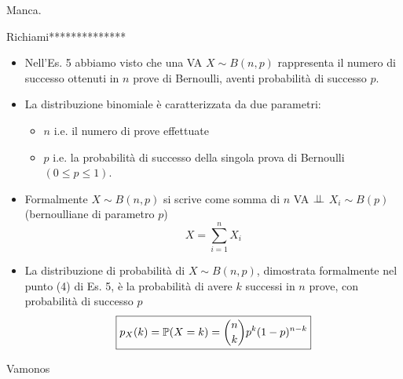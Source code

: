 Manca.
\Soluzione

Richiami**************
\begin{itemize}
\item Nell'Es. 5 abbiamo visto che una VA $X\sim B( n,p)$ rappresenta il numero di successo ottenuti in $n$ prove di Bernoulli, aventi probabilità di successo $p$.
\item La distribuzione binomiale è caratterizzata da due parametri:
\begin{itemize}
\item $n$ i.e. il numero di prove effettuate
\item $p$ i.e. la probabilità di successo della singola prova di Bernoulli $( 0\leq p\leq 1)$.
\end{itemize}
\item Formalmente $X\sim B( n,p)$ si scrive come somma di $n$ VA $\perp \!\!\! \perp $ $X_{i} \sim B( p)$ (bernoulliane di parametro $p$)\begin{equation*}
X=\sum\limits _{i=1}^{n} X_{i}
\end{equation*}
\item La distribuzione di probabilità di $X\sim B( n,p)$, dimostrata formalmente nel punto (4) di Es. 5, è la probabilità di avere $k$ successi in $n$ prove, con probabilità di successo $p$\begin{equation*}
\boxed{p_{X}( k) =\mathbb{P}( X=k) =\binom{n}{k} p^{k}( 1-p)^{n-k}}
\end{equation*}
\end{itemize}

Vamonos

